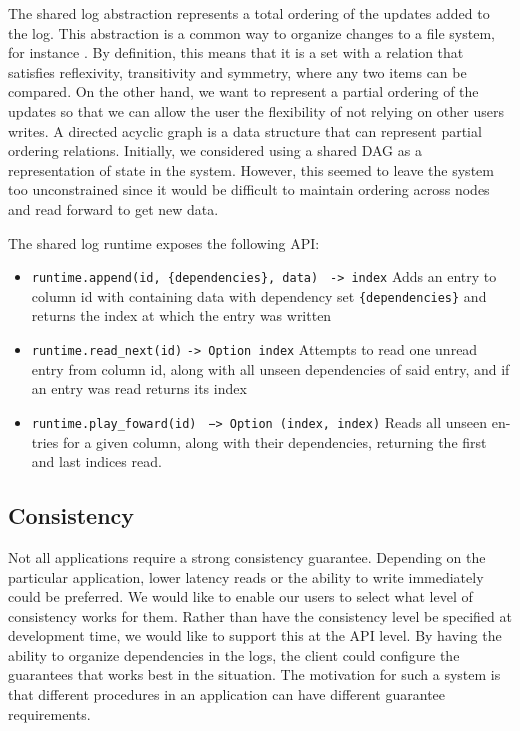 \documentclass[letterpaper,twocolumn,10pt]{article}
\begin{document}
The shared log abstraction represents a total ordering of the updates added to the log. This abstraction is a common way to organize changes to a file system, for instance \cite{Log}. By definition, this means that it is a set with a relation that satisfies reflexivity, transitivity and symmetry, where any two items can be compared. On the other hand, we want to represent a partial ordering of the updates so that we can allow the user the flexibility of not relying on other users writes. A directed acyclic graph is a data structure that can represent partial ordering relations. Initially, we considered using a shared DAG as a representation of state in the system. However, this seemed to leave the system too unconstrained since it would be difficult to maintain ordering across nodes and read forward to get new data. 

The shared log runtime exposes the following API:

\begin{itemize}

\item \verb_runtime.append(id, {dependencies}, data)_ \verb_ -> index_ Adds an entry to column id with containing data with dependency set \verb_{dependencies}_ and returns the index at which the entry was written

\item \verb~runtime.read_next(id)~ \verb~-> Option index~ Attempts to read one unread entry from column id, along with all unseen dependencies of said entry, and if an entry was read returns its index

\item \verb~runtime.play_foward(id)~ \verb~ −> Option (index, index)~ Reads all unseen en- tries for a given column, along with their dependencies, returning the first and last indices read.

\end{itemize}

\subsection{Consistency}

Not all applications require a strong consistency guarantee. Depending on the particular application, lower latency reads or the ability to write immediately could be preferred. We would like to enable our users to select what level of consistency works for them. Rather than have the consistency level be specified at development time, we would like to support this at the API level. By having the ability to organize dependencies in the logs, the client could configure the
guarantees that works best in the situation. The motivation for such a system is that different procedures in an application can have different guarantee requirements.
\end{document}
